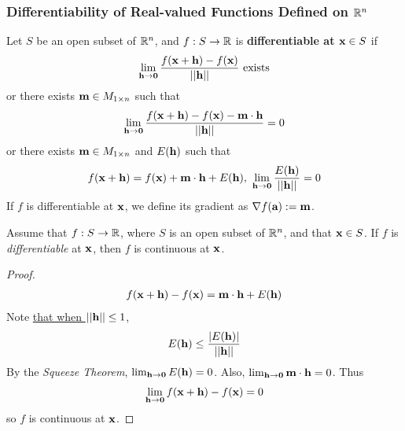 \documentclass[11pt]{article}
\begin{document}
			\subsubsection{Differentiability of Real-valued Functions Defined on $\mathbb{R}^n$}
				\begin{definition}
					Let $S$ be an open subset of $\mathbb{R}^n$, and $f: S \to \mathbb{R}$ is \textbf{differentiable at $\textbf{x} \in S$} if 
					\begin{equation}
						\lim_{\textbf{h} \to \textbf{0}} \frac{
							f(\textbf{x} + \textbf{h}) - f(\textbf{x})
						}{\vert \vert {\textbf{h}} \vert \vert} \text{{ exists}}
					\end{equation}
					or there exists $\textbf{m} \in M_{1\times n}$ such that
					\begin{equation}
						\lim_{\textbf{h} \to \textbf{0}} \frac{
							f(\textbf{x} + \textbf{h}) - f(\textbf{x}) - \textbf{m} \cdot \textbf{h}
						}{\vert \vert {\textbf{h}} \vert \vert} = 0
					\end{equation}
					or there exists $\textbf{m} \in M_{1\times n}$ and $E(\textbf{h})$ such that
					\begin{equation}
						f(\textbf{x} + \textbf{h}) = f(\textbf{x}) + \textbf{m} \cdot \textbf{h} + E(\textbf{h}),\ \lim_{\textbf{h} \to \textbf{0}} \frac{E(\textbf{h})}{\vert \vert {\textbf{h}} \vert \vert} = 0
					\end{equation}
					If $f$ is differentiable at $\textbf{x}$, we define its gradient as $\nabla f(\textbf{a}) := \textbf{m}$.
				\end{definition}

				\begin{theorem}
					Assume that $f: S \to \mathbb{R}$, where $S$ is an open subset of $\mathbb{R}^n$, and that $\textbf{x} \in S$. If $f$ is \emph{differentiable} at $\textbf{x}$, then $f$ is continuous at $\textbf{x}$.
					\begin{proof}
						\begin{gather}
							f(\textbf{x} + \textbf{h}) - f(\textbf{x}) = \textbf{m} \cdot \textbf{h} + E(\textbf{h})
						\end{gather}
						Note \ul{that when $\vert \vert {\textbf{h}} \vert \vert \leq 1$},
						\begin{gather}
							E(\textbf{h}) \leq \frac{|E(\textbf{h})|}{\vert \vert {\textbf{h}} \vert \vert}
						\end{gather}
						By the \emph{Squeeze Theorem}, $\lim_{\textbf{h} \to \textbf{0}} E(\textbf{h}) = 0$. Also, $\lim_{\textbf{h} \to \textbf{0}} \textbf{m} \cdot \textbf{h} = 0$. Thus 
						\begin{gather}
							\lim_{\textbf{h} \to \textbf{0}} f(\textbf{x} + \textbf{h}) - f(\textbf{x}) = 0
						\end{gather}
						so $f$ is continuous at $\textbf{x}$.
					\end{proof}
				\end{theorem}
				
\end{document}
